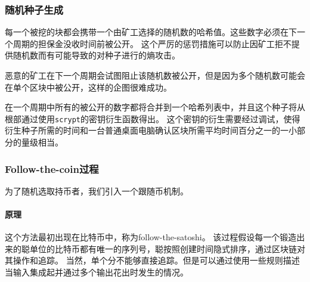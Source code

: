 \documentclass[letterpaper]{article}
\begin{document}
\subsubsection{随机种子生成}

每一个被挖的块都会携带一个由矿工选择的随机数的哈希值。这些数字必须在下一个周期的担保金没收时间前被公开。
这个严厉的惩罚措施可以防止因矿工拒不提供随机数而有可能导致的对种子进行的熵攻击。

恶意的矿工在下一个周期会试图阻止该随机数被公开，但是因为多个随机数可能会在单个区块中被公开，这样的企图很难成功。

在一个周期中所有的被公开的数字都将合并到一个哈希列表中，并且这个种子将从根部通过使用\verb!scrypt!的密钥衍生函数得出。
这个密钥的衍生需要经过调试，使得衍生种子所需的时间和一台普通桌面电脑确认区块所需平均时间百分之一的一小部分的量级相当。

\subsubsection{Follow-the-coin过程}

为了随机选取持币者，我们引入一个跟随币机制。

\paragraph{原理}
这个方法最初出现在比特币中，称为follow-the-satoshi。
该过程假设每一个锻造出来的聪单位的比特币都有唯一的序列号，聪按照创建时间隐式排序，通过区块链对其操作和追踪。
当然，单个分不能够直接追踪。但是可以通过使用一些规则描述当输入集成起并通过多个输出花出时发生的情况。
\end{document}
